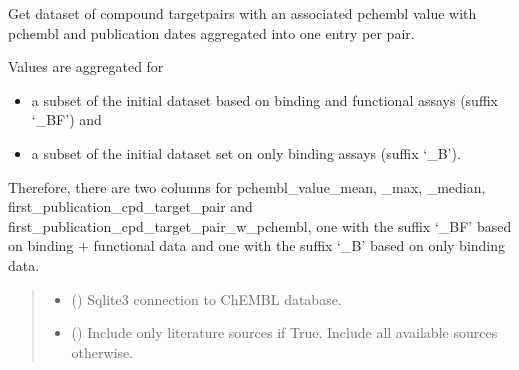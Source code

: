 \documentclass[letterpaper,10pt,english]{sphinxmanual}
\begin{document}
\begin{fulllineitems}
\label{\detokenize{get_activity_ct_pairs:get_activity_ct_pairs.get_aggregated_activity_ct_pairs}}
\pysigstartsignatures
{}
\pysigstopsignatures
\sphinxAtStartPar
Get dataset of compound target\sphinxhyphen{}pairs with an associated pchembl value
with pchembl and publication dates aggregated into one entry per pair.

\sphinxAtStartPar
Values are aggregated for
\begin{itemize}
\item {} 
\sphinxAtStartPar
a subset of the initial dataset based on binding and functional assays (suffix ‘\_BF’) and

\item {} 
\sphinxAtStartPar
a subset of the initial dataset set on only binding assays (suffix ‘\_B’).

\end{itemize}

\sphinxAtStartPar
Therefore, there are two columns for pchembl\_value\_mean, \_max, \_median,
first\_publication\_cpd\_target\_pair and first\_publication\_cpd\_target\_pair\_w\_pchembl,
one with the suffix ‘\_BF’ based on binding + functional data
and one with the suffix ‘\_B’ based on only binding data.
\begin{quote}\begin{description}
\begin{itemize}
\item {} 
\sphinxAtStartPar
{} () \textendash{} Sqlite3 connection to ChEMBL database.

\item {} 
\sphinxAtStartPar
{} () \textendash{} Include only literature sources if True.
Include all available sources otherwise.


\end{itemize}
\end{description}
\end{quote}
\end{fulllineitems}
\end{document}
